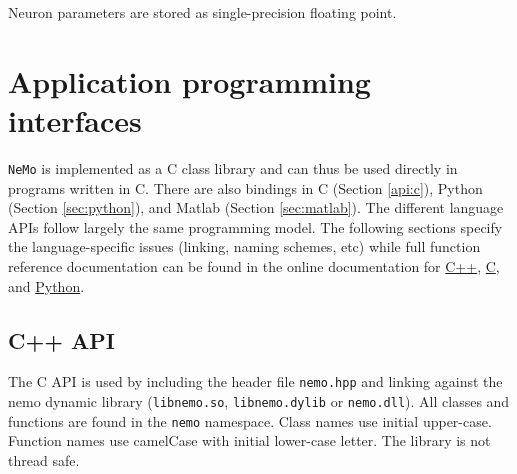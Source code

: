 \documentclass[a4paper]{article}
\newcommand{\nemo}{\texttt{NeMo}\xspace}
\newcommand{\code}[1]{\texttt{#1}}
\newcommand{\file}[1]{\texttt{#1}}
\newcommand{\cpp}{C\nolinebreak\hspace{-.05em}\raisebox{.4ex}{\tiny\bf +}\nolinebreak\hspace{-.10em}\raisebox{.4ex}{\tiny\bf +}\xspace}
\begin{document}
Neuron parameters are stored as single-precision floating point.






% 

\section{Application programming interfaces}
\label{api}

\nemo is implemented as a \cpp class library and can thus be used directly in
programs written in \cpp. There are also bindings in C (Section \ref{api:c}),
Python (Section \ref{sec:python}), and Matlab (Section \ref{sec:matlab}). The
different language APIs follow largely the same programming model.  The
following sections specify the language-specific issues (linking, naming
schemes, etc) while full function reference documentation can be found in the
online documentation for
\href{http://nemosim.sourceforge.net/api/index.html}{C++},
\href{http://nemosim.sourceforge.net/api/nemo_8h.html}{C}, and
\href{http://nemosim.sourceforge.net/python/nemo.html}{Python}.

\newpage

\subsection{C++ API}
\label{api:cpp}

The \cpp API is used by including the header file \file{nemo.hpp} and linking
against the nemo dynamic library (\file{libnemo.so}, \file{libnemo.dylib} or
\file{nemo.dll}). All classes and functions are found in the \code{nemo}
namespace. Class names use initial upper-case. Function names use camelCase
with initial lower-case letter. The library is not thread safe.
\end{document}
